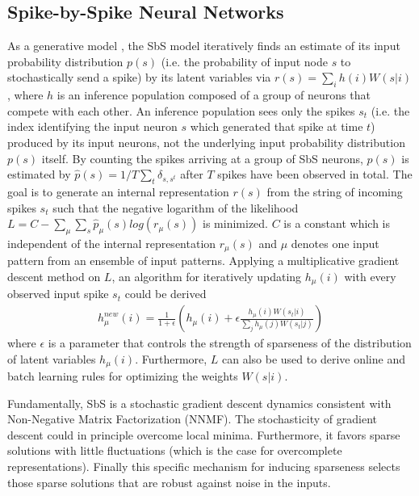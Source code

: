 \subsection{Spike-by-Spike Neural Networks}
\label{sec:sbs}
  
  As a generative model \cite{ernst2007efficient}, the SbS model iteratively finds an estimate of its input probability distribution $p(s)$ (i.e. the probability of input node $s$ to stochastically send a spike) by its latent variables via $r(s) = \sum_i h(i) W(s|i)$, where $ h $ is an inference population composed of a group of neurons that compete with each other. An inference population sees only the spikes $s_t$ (i.e. the index identifying the input neuron $s$ which generated that spike at time $t$) produced by its input neurons, not the underlying input probability distribution $p(s)$ itself. By counting the spikes arriving at a group of SbS neurons, $p(s)$ is estimated by $\hat{p}(s) = 1/T \sum_t \delta_{s,s^t}$ after $T$ spikes have been observed in total. The goal is to generate an internal representation $r(s)$ from the string of incoming spikes $s_t$ such that the negative logarithm of the likelihood $L = C - \sum_\mu \sum_s \hat{p}_\mu(s) log\left( r_\mu(s) \right)$ is minimized. $C$ is a constant which is independent of the internal representation $r_\mu(s)$ and $\mu$ denotes one input pattern from an ensemble of input patterns. Applying a multiplicative gradient descent method on $L$, an algorithm for iteratively updating $h_\mu(i)$ with every observed input spike $s_t$ could be derived \cite{ernst2007efficient}
  \begin{eqnarray} \label{eq:sbs_update}
  h_\mu^{new}(i) = \frac{1}{1+\epsilon} \left(h_\mu(i) + \epsilon \frac{h_\mu(i) W(s_t|i) }{\sum_j h_\mu(j) W(s_t|j)} \right) 
  \end{eqnarray}
  where $\epsilon$ is a parameter that controls the strength of sparseness of the distribution of latent variables $h_\mu(i)$. Furthermore, $L$ can also be used to derive online and batch learning rules for optimizing the weights $W(s|i)$. 


Fundamentally, SbS is a stochastic gradient descent dynamics
consistent with Non-Negative Matrix Factorization (NNMF). The stochasticity of gradient descent could
in principle overcome local minima.  Furthermore, it favors sparse
solutions with little fluctuations (which is the case for overcomplete
representations). Finally this specific mechanism for inducing
sparseness selects those sparse solutions that are robust against
noise in the inputs.

